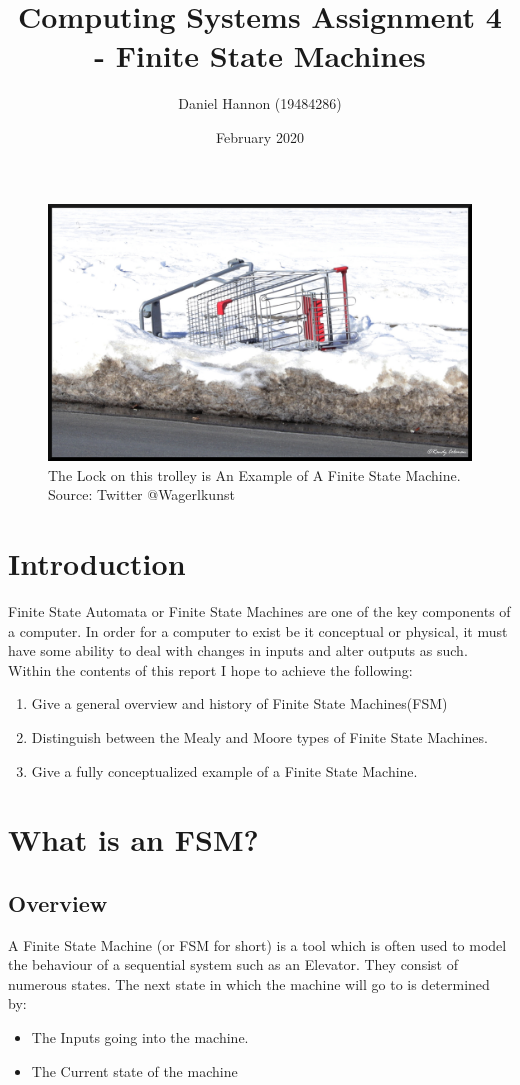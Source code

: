 \documentclass{article}
\title{Computing Systems Assignment 4 - Finite State Machines}
\author{Daniel Hannon (19484286)}
\date{February 2020}
\begin{document}
\maketitle

\begin{figure}[h!]
	\centering
	\includegraphics[scale=0.24]{images/cover-trolley.jpg}
	\caption{The Lock on this trolley is An Example of A Finite State Machine. Source: Twitter @Wagerlkunst}
	\label{fig:trolley}
\end{figure}

\section{Introduction}
Finite State Automata or Finite State Machines are one of the key components of a computer. In order for a computer to exist be it conceptual or physical, it must have some ability to deal with changes in inputs and alter outputs as such.
\\ Within the contents of this report I hope to achieve the following:
\begin{enumerate}
	\item Give a general overview and history of Finite State Machines(FSM)
	\item Distinguish between the Mealy and Moore types of Finite State Machines.
	\item Give a fully conceptualized example of a Finite State Machine.
\end {enumerate}

\section{What is an FSM?}
\subsection{Overview}
A Finite State Machine (or FSM for short) is a tool which is often used to model the behaviour of a sequential system such as an Elevator. They consist of numerous states. The next state in which the machine will go to is determined by:
\begin{itemize}
	\item The Inputs going into the machine.
	\item The Current state of the machine
\end {itemize}
\newpage
\end{document}

